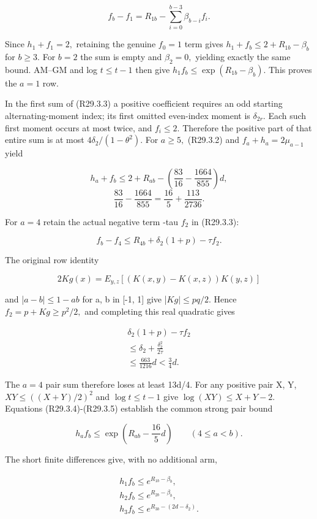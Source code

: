 \[
f_b-f_1=R_{1b}-\sum_{i=0}^{b-3}\beta_{b-i}f_i.
\tag{R29.3.3a}
\]

Since \(h_1+f_1=2,\allowbreak \) retaining the genuine \(f_0=1\) term gives
\(h_1+f_b\le 2+R_{1b}-\beta_b\) for \(b\ge 3.\) For \(b=2\) the sum is empty
and \(\beta_2=0,\allowbreak \) yielding exactly the same bound. AM--GM and
log \(t\le t-1\) then give \(h_1f_b\le \exp(R_{1b}-\beta_b).\)
This proves the $a=1$ row.


In the first sum of (R29.3.3) a positive
coefficient requires an odd starting alternating-moment index; its first
omitted even-index moment is \(\delta_{2r}.\) Each such first moment occurs at
most twice, and \(f_i\le 2.\) Therefore the positive part of that entire sum
is at most \(4\delta_2/(1-\theta^2)\). For \(a\ge 5,\allowbreak \) (R29.3.2) and
\(f_a+h_a=2\mu_{a-1}\) yield

\[
h_a+f_b\le2+R_{ab}
-\left(\frac{83}{16}-\frac{1664}{855}\right)d,
\]
\[
\frac{83}{16}-\frac{1664}{855}
=\frac{16}{5}+\frac{113}{2736}.
\tag{R29.3.4}
\]

For \(a=4\) retain the actual negative term -tau \(f_2\) in (R29.3.3):

\[
f_b-f_4\le R_{4b}+\delta_2(1+p)-\tau f_2.
\]

The original row identity

\[
2Kg(x)=E_{y,z}[(K(x,y)-K(x,z))K(y,z)]
\]

and |\(a-b|\le 1-ab\) for a, b in [-1, 1] give |\(Kg|\le pq/2.\)
Hence \(f_2=p+Kg\ge p^2/2,\allowbreak \) and completing this real quadratic gives

\[
\begin{gathered}
\delta_2(1+p)-\tau f_2\\
\le \delta_2+\frac{\delta_2^2}{2\tau}\\
\le\frac{663}{1216}d<\frac34d.
\end{gathered}\tag{R29.3.5}
\]

The \(a=4\) pair sum therefore loses at least 13d/4.
For any positive pair X, Y, \(XY\le((X+Y)/2)^2\) and
\(\log t\le t-1\) give \(\log(XY)\le X+Y-2\).
Equations (R29.3.4)-(R29.3.5) establish the common strong pair bound

\[
h_af_b\le\exp\left(R_{ab}-\frac{16}{5}d\right)
\qquad(4\le a<b).
\tag{R29.3.6}
\]

The short finite differences give, with no additional arm,

\[
\begin{gathered}
h_1f_b\le e^{R_{1b}-\beta_b},\quad\\
h_2f_b\le e^{R_{2b}-\beta_b},\quad\\
h_3f_b\le e^{R_{3b}-(2d-\delta_2)}.
\end{gathered}\tag{R29.3.7}
\]

